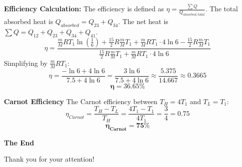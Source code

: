 \documentclass[t,aspectratio=169]{beamer}
\begin{document}
\begin{frame}
\begin{itemize}
\begin{enumerate}
\textbf{Efficiency Calculation:}
The efficiency is defined as $\eta = \frac{\sum Q}{Q_{absorbed, total}}$.
The total absorbed heat is $Q_{absorbed} = Q_{23} + Q_{34}$.
The net heat is $\sum Q = Q_{12} + Q_{23} + Q_{34} + Q_{41}$.
$$ \eta = \frac{\frac{m}{M} R T_1 \ln(\frac{1}{6}) + \frac{15}{2} R \frac{m}{M} T_1 + \frac{m}{M} R T_1 \cdot 4 \ln 6 - \frac{15}{2} R \frac{m}{M} T_1}{\frac{15}{2} R \frac{m}{M} T_1 + \frac{m}{M} R T_1 \cdot 4 \ln 6} $$
Simplifying by $\frac{m}{M} R T_1$:
$$ \eta = \frac{-\ln 6 + 4 \ln 6}{7.5 + 4 \ln 6} = \frac{3 \ln 6}{7.5 + 4 \ln 6} \approx \frac{5.375}{14.667} \approx 0.3665 $$
$$ \mathbf{\eta = 36.65\%} $$

\pagebreak
\textbf{Carnot Efficiency}
The Carnot efficiency between $T_H = 4T_1$ and $T_L = T_1$:
$$ \eta_{Carnot} = \frac{T_H - T_L}{T_H} = \frac{4T_1 - T_1}{4T_1} = \frac{3}{4} = 0.75 $$
$$ \mathbf{\eta_{Carnot} = 75\%} $$

\end{enumerate}

\end{itemize}

\end{frame}


\begin{frame}

\vfill
\begin{center}
\textbf{\huge The End}

\bigskip
Thank you for your attention!
\end{center}
\vfill
\end{frame}
\end{document}
